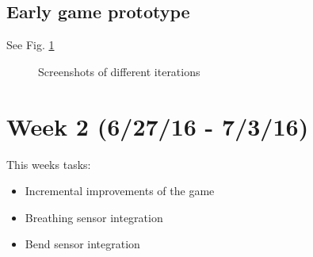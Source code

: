 \documentclass{article}
\begin{document}
    \subsection{Early game prototype}
        See Fig. \ref{fig:prototype_screenshots}
        \begin{figure}[h]
            \caption{Screenshots of different iterations}
            \label{fig:prototype_screenshots}
        \end{figure}

\section{Week 2 (6/27/16 - 7/3/16)}
    This weeks tasks:
    \begin{itemize}
        \item Incremental improvements of the game
        \item Breathing sensor integration
        \item Bend sensor integration
    \end{itemize}
\end{document}
